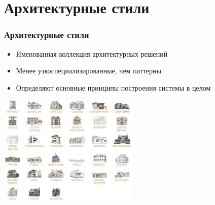 \documentclass{../../slides-style}
\begin{document}
    \section{Архитектурные стили}

    \begin{frame}
        \frametitle{Архитектурные стили}
        \begin{itemize}
            \item Именованная коллекция архитектурных решений
            \item Менее узкоспециализированные, чем паттерны
            \item Определяют основные принципы построения системы в целом
        \end{itemize}
        \begin{center}
            \includegraphics[width=0.5\textwidth]{buildingStyles.png}
        \end{center}
    \end{frame}
\end{document}
